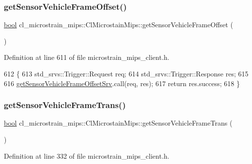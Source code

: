 \subsubsection{\texorpdfstring{get\+Sensor\+Vehicle\+Frame\+Offset()}{getSensorVehicleFrameOffset()}}
{\footnotesize\ttfamily \hyperlink{classbool}{bool} cl\+\_\+microstrain\+\_\+mips\+::\+Cl\+Microstain\+Mips\+::get\+Sensor\+Vehicle\+Frame\+Offset (\begin{DoxyParamCaption}{ }\end{DoxyParamCaption})\hspace{0.3cm}{\ttfamily [inline]}}



Definition at line 611 of file microstrain\+\_\+mips\+\_\+client.\+h.


\begin{DoxyCode}
612     \{
613         std\_srvs::Trigger::Request req;
614         std\_srvs::Trigger::Response res;
615 
616         \hyperlink{classcl__microstrain__mips_1_1ClMicrostainMips_a12957749416c955e1b0132cb2213f879}{getSensorVehicleFrameOffsetSrv}.call(req, res);
617         \textcolor{keywordflow}{return} res.success;
618     \}
\end{DoxyCode}
\mbox{\label{classcl__microstrain__mips_1_1ClMicrostainMips_a184450cf337fe02c9ef4101520d9f9a5}} 
\subsubsection{\texorpdfstring{get\+Sensor\+Vehicle\+Frame\+Trans()}{getSensorVehicleFrameTrans()}}
{\footnotesize\ttfamily \hyperlink{classbool}{bool} cl\+\_\+microstrain\+\_\+mips\+::\+Cl\+Microstain\+Mips\+::get\+Sensor\+Vehicle\+Frame\+Trans (\begin{DoxyParamCaption}{ }\end{DoxyParamCaption})\hspace{0.3cm}{\ttfamily [inline]}}



Definition at line 332 of file microstrain\+\_\+mips\+\_\+client.\+h.


